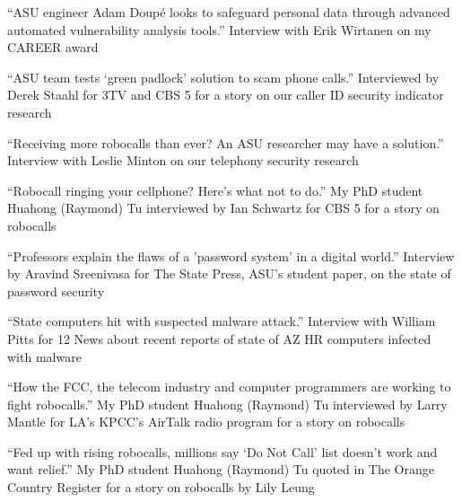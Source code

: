 \documentclass[11pt,letterpaper,sans]{moderncv}
\begin{document}



 {``ASU engineer Adam Doup\'e looks to
  safeguard personal data through advanced automated vulnerability
  analysis tools.'' Interview with Erik Wirtanen on my CAREER award}

 {``ASU team tests `green padlock' solution to
  scam phone calls.'' Interviewed by Derek Staahl for 3TV and CBS 5
  for a story on our caller ID security indicator research}

 {``Receiving more robocalls than ever? An ASU
  researcher may have a solution.'' Interview with Leslie Minton on our
  telephony security research}

 {``Robocall ringing your cellphone? Here's
  what not to do.'' My PhD student Huahong (Raymond) Tu interviewed by
  Ian Schwartz for CBS 5 for a story on robocalls}

 {``Professors explain the flaws of a
  'password system' in a digital world.'' Interview by Aravind
  Sreenivasa for The State Press, ASU's student paper, on the state of
  password security}

 {``State computers hit with suspected
  malware attack.'' Interview with William Pitts for 12 News about
  recent reports of state of AZ HR computers infected with malware}

 {``How the FCC, the telecom industry and
  computer programmers are working to fight robocalls.'' My PhD
  student Huahong (Raymond) Tu interviewed by Larry Mantle for LA’s KPCC’s AirTalk radio program for a story on robocalls}

 {``Fed up with rising robocalls, millions
  say ‘Do Not Call’ list doesn’t work and want relief.'' My PhD
  student Huahong (Raymond) Tu quoted in The Orange Country Register for a story on robocalls by Lily Leung}
\end{document}
